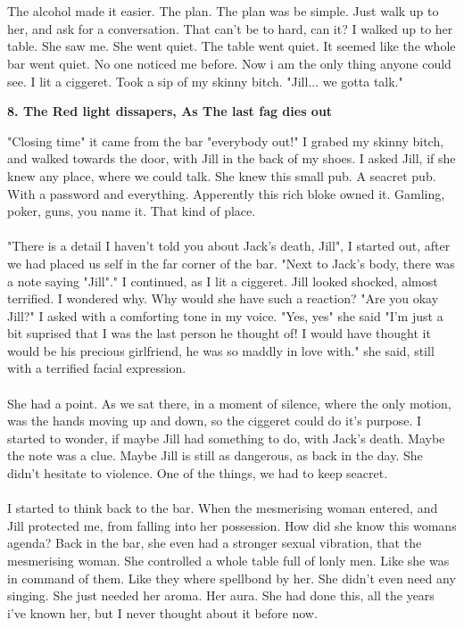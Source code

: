 \documentclass[]{article}
\begin{document}
\\ \\
The alcohol made it easier. The plan. The plan was be simple. Just walk up to her, and ask for a conversation. That can't be to hard, can it? I walked up to her table. She saw me. She went quiet. The table went quiet. It seemed like the whole bar went quiet. No one noticed me before. Now i am the only thing anyone could see. I lit a ciggeret. Took a sip of my skinny bitch. "Jill... we gotta talk."

\newpage

\begin{center}
\large\textbf{8. The Red light dissapers, \newline As The last fag dies out}
\end{center}

"Closing time" it came from the bar "everybody out!" I grabed my skinny bitch, and walked towards the door, with Jill in the back of my shoes. I asked Jill, if she knew any place, where we could talk. She knew this small pub. A seacret pub. With a password and everything. Apperently this rich bloke owned it. Gamling, poker, guns, you name it. That kind of place. 
\\ \\
"There is a detail I haven't told you about Jack's death, Jill", I started out, after we had placed us self in the far corner of the bar. "Next to Jack's body, there was a note saying "Jill"." I continued, as I lit a ciggeret. Jill looked shocked, almost terrified. I wondered why. Why would she have such a reaction? "Are you okay Jill?" I asked with a comforting tone in my voice. "Yes, yes" she said "I'm just a bit suprised that I was the last person he thought of! I would have thought it would be his precious girlfriend, he was so maddly in love with." she said, still with a terrified facial expression.
\\ \\
She had a point. As we sat there, in a moment of silence, where the only motion, was the hands moving up and down, so the ciggeret could do it's purpose. I started to wonder, if maybe Jill had something to do, with Jack's death. Maybe the note was a clue. Maybe Jill is still as dangerous, as back in the day. She didn't hesitate to violence. One of the things, we had to keep seacret.
\\ \\
I started to think back to the bar. When the mesmerising woman entered, and Jill protected me, from falling into her possession. How did she know this womans agenda? Back in the bar, she even had a stronger sexual vibration, that the mesmerising woman. She controlled a whole table full of lonly men. Like she was in command of them. Like they where spellbond by her. She didn't even need any singing. She just needed her aroma. Her aura. She had done this, all the years i've known her, but I never thought about it before now.
\end{document}

